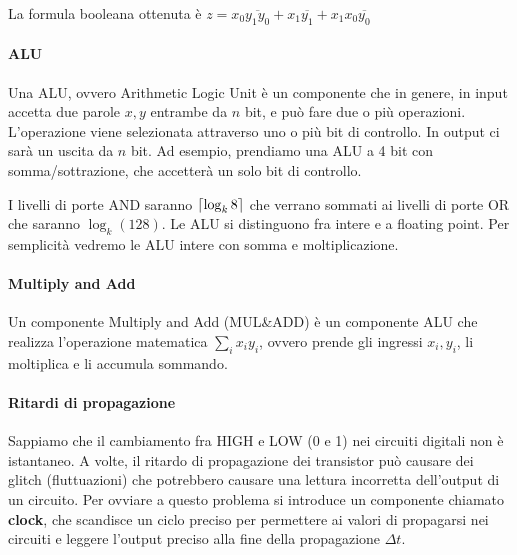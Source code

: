 La formula booleana ottenuta è $ z = x_0\overbar{y_1y_0} + x_1\overbar{y_1} + x_1x_0\overbar{y_0} $

\paragraph{ALU}
Una ALU, ovvero Arithmetic Logic Unit è un componente che in genere, in input accetta due parole $ x,y $ entrambe da $ n $ bit, e può fare due o più operazioni. L'operazione viene selezionata attraverso uno o più bit di controllo. In output ci sarà un uscita da $ n $ bit. Ad esempio, prendiamo una ALU a 4 bit con somma/sottrazione, che accetterà un solo bit di controllo.


I livelli di porte AND saranno $ \lceil\log_k8\rceil $ che verrano sommati ai livelli di porte OR che saranno $ \log_k(128) $. Le ALU si distinguono fra intere e a floating point. Per semplicità vedremo le ALU intere con somma e moltiplicazione.



\paragraph{Multiply and Add}
Un componente Multiply and Add (MUL\&ADD) è un componente ALU che realizza l'operazione matematica $ \sum_{i}x_iy_i $, ovvero prende gli ingressi $ x_i,y_i $, li moltiplica e li accumula sommando.


\paragraph{Ritardi di propagazione}

Sappiamo che il cambiamento fra HIGH e LOW (0 e 1) nei circuiti digitali non è istantaneo. A volte, il ritardo di propagazione dei transistor può causare dei glitch (fluttuazioni) che potrebbero causare una lettura incorretta dell'output di un circuito. Per ovviare a questo problema si introduce un componente chiamato \textbf{clock}, che scandisce un ciclo preciso per permettere ai valori di propagarsi nei circuiti e leggere l'output preciso alla fine della propagazione $ \Delta t $.



